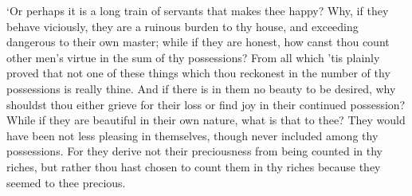\documentclass[11pt]{book}
\begin{document}
`Or perhaps it is a long train of servants that makes thee happy? Why,
if they behave viciously, they are a ruinous burden to thy house, and
exceeding dangerous to their own master; while if they are honest, how
canst thou count other men's virtue in the sum of thy possessions? From
all which 'tis plainly proved that not one of these things which thou
reckonest in the number of thy possessions is really thine. And if there
is in them no beauty to be desired, why shouldst thou either grieve for
their loss or find joy in their continued possession? While if they are
beautiful in their own nature, what is that to thee? They would have
been not less pleasing in themselves, though never included among thy
possessions. For they derive not their preciousness from being counted
in thy riches, but rather thou hast chosen to count them in thy riches
because they seemed to thee precious.
\end{document}
